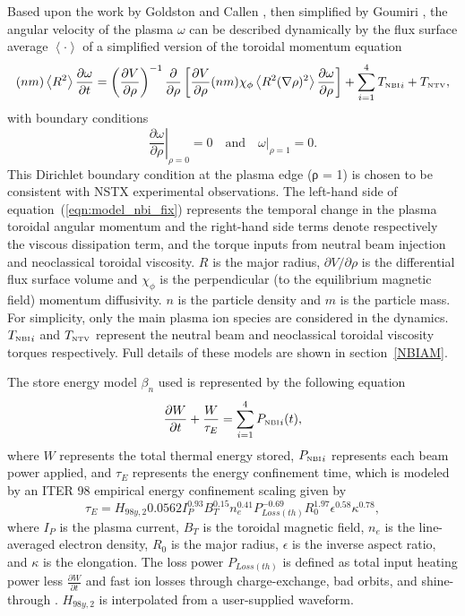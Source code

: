 \documentclass[12pt,lot, lof]{puthesis}
\begin{document}
Based upon the work by Goldston \cite{Goldston86}  and Callen  \cite{Callen09}, then simplified by Goumiri \cite{Goumiri15}, the angular velocity of the plasma $\omega$ can be described dynamically by the flux surface average $\left<\cdot\right>$ of a simplified version of the toroidal momentum equation 
\begin{equation}
  (n m) \left<R^2\right>
 \frac{\partial \omega}{\partial t}
 = \left( \frac{\partial V}{\partial\rho}\right)^{-1}
   \frac{\partial}{\partial \rho} 
   \left[\frac{\partial V}{\partial \rho} (n m) \chi_\phi 
   \left< R^2 (\nabla \rho)^2\right> 
   \frac{\partial\omega}{\partial\rho}\right]
   + \sum _ {i=1}^{4}  {T_\textrm{\tiny NBI}}_i + T_\textrm{\tiny NTV}, 
\label{eqn:model_nbi_fix}
\end{equation}
with boundary conditions
\begin{equation}
\left.\frac{\partial\omega}{\partial\rho}\right|_{\rho=0} = 0 
\quad \text{and} \quad 
\left.\omega\right|_{\rho=1} = 0.
\label{bc0}
\end{equation}
This Dirichlet boundary condition at the plasma edge (ρ = 1) is chosen to be consistent with NSTX experimental observations.
The left-hand side of equation~(\ref{eqn:model_nbi_fix}) represents the temporal change in the plasma toroidal angular momentum and the right-hand side terms denote respectively the viscous dissipation term, and the torque inputs from neutral beam injection and neoclassical toroidal viscosity. $R$ is the major radius, $\partial V/\partial\rho$ is the differential flux surface volume and $\chi_\phi$ is the perpendicular (to the equilibrium magnetic field) momentum diffusivity. $n$ is the particle density and $m$ is the particle mass. For simplicity, only the main plasma ion species are considered in the dynamics.
${T_\textrm{\tiny NBI}}_i $ and $T_\textrm{\tiny NTV}$ represent the neutral beam and neoclassical toroidal viscosity torques respectively. Full details of these models are shown in section~\ref{NBIAM}.

The store energy model $\beta_n$ used is represented by the following equation
\begin{equation}
\frac{\partial W}{\partial t}
   + \frac{W}{\tau_E}  =\sum_{i=1}^{4}{P_\textrm{\tiny{NBI}}}_i(t),
\label{energy}
\end{equation}
where $W$ represents the total thermal energy stored, ${P_\textrm{\tiny{NBI}}}_i$ represents each beam power applied, and ${\tau_E} $ represents the energy confinement time, which is modeled by an ITER 98 empirical energy confinement scaling \cite{Iter99} given by
\begin{equation}
\tau_E = H_{98y,2} 0.0562 I_{P}^{0.93} B_{T}^{0.15} n_{e}^{0.41} P_{Loss(th)}^{-0.69} R_{0}^{1.97} {\epsilon}^{0.58} \kappa^{0.78},
\end{equation}
where $I_P$ is the plasma current, $B_T$ is the toroidal magnetic field, $n_e$ is the line-averaged electron density, $R_0$ is the major radius, $\epsilon$ is the inverse aspect ratio, and $\kappa$ is the elongation. The loss power $P_{Loss(th)}$ is defined as total input heating power less $\frac{\partial W}{\partial t}$ and fast ion losses through charge-exchange, bad orbits, and shine-through \cite{Kaye06}.
$H_{98y,2} $ is interpolated from a user-supplied waveform.
\end{document}
